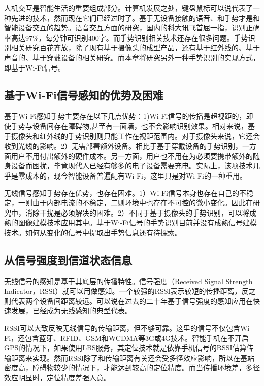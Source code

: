 人机交互是智能生活的重要组成部分。计算机发展之处，键盘鼠标可以说代表了一种先进的技术，然而现在它们已经过时了。基于无设备接触的语音、和手势才是和智能设备交互的趋势。语音交互方面的研究，国内的科大讯飞首屈一指，识别正确率高达97\%，每分钟可识别400字。而手势识别相关技术还存在很多问题。手势识别相关研究百花齐放，除了现有基于摄像头的成型产品，还有基于红外线的、基于声音的、基于穿戴设备的相关研究。而本章将研究另外一种手势识别的实现方式，即基于Wi-Fi信号。


 \subsection{基于Wi-Fi信号感知的优势及困难}

基于Wi-Fi感知手势主要存在以下几点优势：1)Wi-Fi信号的传播是超视距的，即使手势与设备间存在障碍物,甚至有一面墙，也不会影响识别效果。相对来说，基于摄像头和红外线的手势识别则只能工作在视距范围内。对于摄像头来说，它还会收到光线的影响。2）无需部署额外设备。相比于基于穿戴设备的手势识别，一方面用户不用付出额外的硬件成本。另一方面，用户也不用在为必须要携带额外的随身设备而困扰，毕竟现代人已经有够多的电子设备需要充电。实际上，该项技术几乎是零成本的，现今智能设备普遍配有Wi-Fi，这里只是对Wi-Fi的一种重用。

无线信号感知手势存在优势，也存在困难。1）Wi-Fi信号本身也存在自己的不稳定，一则由于内部电流的不稳定，二则环境中也存在不可控的微小变化。因此在研究中，消除干扰是必须解决的困难。2）不同于基于摄像头的手势识别，可以将成熟的图像建模技术应用其中。基于Wi-Fi信号的手势识别目前并没有成熟信号建模技术。如何从变化的信号中提取出手势信息还有待探索。


\subsection{从信号强度到信道状态信息}

无线信号的感知是基于其底层的传播特性。信号强度（Received Signal Strength Indicator，RSSI）就可以用做感知。一个较强的RSSI表示较短的传播距离，反之则代表两个设备间距离较远。可以说在过去的二十年基于信号强度的感知应用在快速发展，已经成为无线感知的典型代表。

RSSI可以大致反映无线信号的传输距离，但不够可靠。这里的信号不仅包含Wi-Fi，还包含蓝牙、RFID、GSM和WCDMA等3G或4G技术。智能手机在不开启GPS的情况下，如果使用LBS服务，其定位技术就是依靠手机信号的RSSI估算传输距离来实现。然而RSSI除了和传输距离有关还会受多径效应影响，所以在基站密度高，障碍物较少的情况下，才能达到较高的定位精度。而当传播环境差，多径效应明显时，定位精度差强人意。

